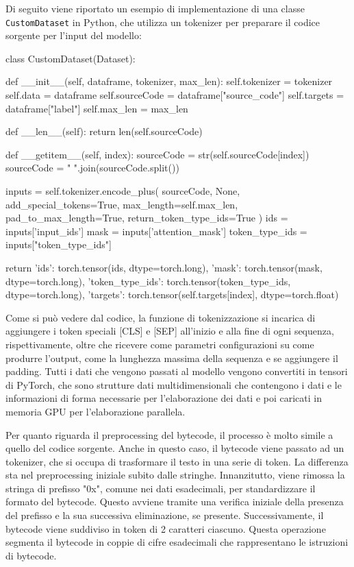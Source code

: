 \documentclass[../../Thesis.tex]{subfiles}
\begin{document}
Di seguito viene riportato un esempio di implementazione di una classe \texttt{CustomDataset} in Python, che utilizza un tokenizer per preparare il codice sorgente per l'input del modello:

\begin{python}
class CustomDataset(Dataset):

    def __init__(self, dataframe, tokenizer, max_len):
        self.tokenizer = tokenizer
        self.data = dataframe
        self.sourceCode = dataframe["source_code"]
        self.targets = dataframe["label"]
        self.max_len = max_len

    def __len__(self):
        return len(self.sourceCode)

    def __getitem__(self, index):
        sourceCode = str(self.sourceCode[index])
        sourceCode = " ".join(sourceCode.split())

        inputs = self.tokenizer.encode_plus(
            sourceCode,
            None,
            add_special_tokens=True,
            max_length=self.max_len,
            pad_to_max_length=True,
            return_token_type_ids=True
        )
        ids = inputs['input_ids']
        mask = inputs['attention_mask']
        token_type_ids = inputs["token_type_ids"]

        return {
            'ids': torch.tensor(ids, dtype=torch.long),
            'mask': torch.tensor(mask, dtype=torch.long),
            'token_type_ids': torch.tensor(token_type_ids, dtype=torch.long),
            'targets': torch.tensor(self.targets[index], dtype=torch.float)
        }
\end{python}

Come si può vedere dal codice, la funzione di tokenizzazione si incarica di aggiungere i token speciali [CLS] e [SEP] all'inizio e alla fine di ogni sequenza, rispettivamente, oltre che ricevere come parametri configurazioni su come produrre l'output, come la lunghezza massima della sequenza e se aggiungere il padding. Tutti i dati che vengono passati al modello vengono convertiti in tensori di PyTorch, che sono strutture dati multidimensionali che contengono i dati e le informazioni di forma necessarie per l'elaborazione dei dati e poi caricati in memoria GPU per l'elaborazione parallela.

Per quanto riguarda il preprocessing del bytecode, il processo è molto simile a quello del codice sorgente. Anche in questo caso, il bytecode viene passato ad un tokenizer, che si occupa di trasformare il testo in una serie di token. La differenza sta nel preprocessing iniziale subito dalle stringhe. Innanzitutto, viene rimossa la stringa di prefisso "0x", comune nei dati esadecimali, per standardizzare il formato del bytecode. Questo avviene tramite una verifica iniziale della presenza del prefisso e la sua successiva eliminazione, se presente. Successivamente, il bytecode viene suddiviso in token di 2 caratteri ciascuno. Questa operazione segmenta il bytecode in coppie di cifre esadecimali che rappresentano le istruzioni di bytecode.
\end{document}
